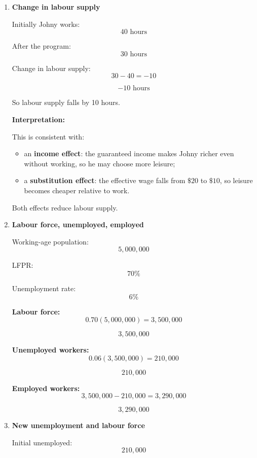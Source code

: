 \documentclass[12pt]{article}
\begin{document}
\begin{enumerate}[label=(\alph*)]
\[
\boxed{60\text{ hours}}
\]


\item \textbf{Change in labour supply}

Initially Johny works:
\[
40\text{ hours}
\]

After the program:
\[
30\text{ hours}
\]

Change in labour supply:
\[
30-40=-10
\]

\[
\boxed{-10\text{ hours}}
\]

So labour supply falls by 10 hours.

\textbf{Interpretation:}

This is consistent with:
\begin{itemize}
    \item an \textbf{income effect}: the guaranteed income makes Johny richer even without working, so he may choose more leisure;
    \item a \textbf{substitution effect}: the effective wage falls from \(\$20\) to \(\$10\), so leisure becomes cheaper relative to work.
\end{itemize}

Both effects reduce labour supply.


\item \textbf{Labour force, unemployed, employed}

Working-age population:
\[
5{,}000{,}000
\]

LFPR:
\[
70\%
\]

Unemployment rate:
\[
6\%
\]

\textbf{Labour force:}
\[
0.70(5{,}000{,}000)=3{,}500{,}000
\]

\[
\boxed{3{,}500{,}000}
\]

\textbf{Unemployed workers:}
\[
0.06(3{,}500{,}000)=210{,}000
\]

\[
\boxed{210{,}000}
\]

\textbf{Employed workers:}
\[
3{,}500{,}000-210{,}000=3{,}290{,}000
\]

\[
\boxed{3{,}290{,}000}
\]


\item \textbf{New unemployment and labour force}

Initial unemployed:
\[
210{,}000
\]


\end{enumerate}
\end{document}
